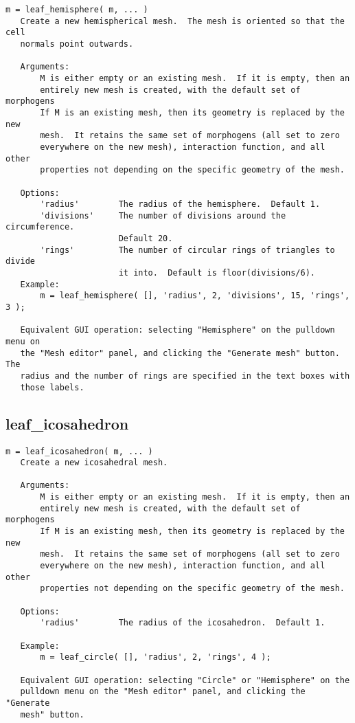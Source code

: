 \begin{verbatim}
m = leaf_hemisphere( m, ... )
   Create a new hemispherical mesh.  The mesh is oriented so that the cell
   normals point outwards.

   Arguments:
       M is either empty or an existing mesh.  If it is empty, then an
       entirely new mesh is created, with the default set of morphogens
       If M is an existing mesh, then its geometry is replaced by the new
       mesh.  It retains the same set of morphogens (all set to zero
       everywhere on the new mesh), interaction function, and all other
       properties not depending on the specific geometry of the mesh.

   Options:
       'radius'        The radius of the hemisphere.  Default 1.
       'divisions'     The number of divisions around the circumference.
                       Default 20.
       'rings'         The number of circular rings of triangles to divide
                       it into.  Default is floor(divisions/6).
   Example:
       m = leaf_hemisphere( [], 'radius', 2, 'divisions', 15, 'rings', 3 );

   Equivalent GUI operation: selecting "Hemisphere" on the pulldown menu on
   the "Mesh editor" panel, and clicking the "Generate mesh" button.  The
   radius and the number of rings are specified in the text boxes with
   those labels.
\end{verbatim}

\subsection{leaf\_icosahedron}\label{section-leaf-icosahedron}

\begin{verbatim}
m = leaf_icosahedron( m, ... )
   Create a new icosahedral mesh.

   Arguments:
       M is either empty or an existing mesh.  If it is empty, then an
       entirely new mesh is created, with the default set of morphogens
       If M is an existing mesh, then its geometry is replaced by the new
       mesh.  It retains the same set of morphogens (all set to zero
       everywhere on the new mesh), interaction function, and all other
       properties not depending on the specific geometry of the mesh.

   Options:
       'radius'        The radius of the icosahedron.  Default 1.

   Example:
       m = leaf_circle( [], 'radius', 2, 'rings', 4 );

   Equivalent GUI operation: selecting "Circle" or "Hemisphere" on the
   pulldown menu on the "Mesh editor" panel, and clicking the "Generate
   mesh" button.
\end{verbatim}

